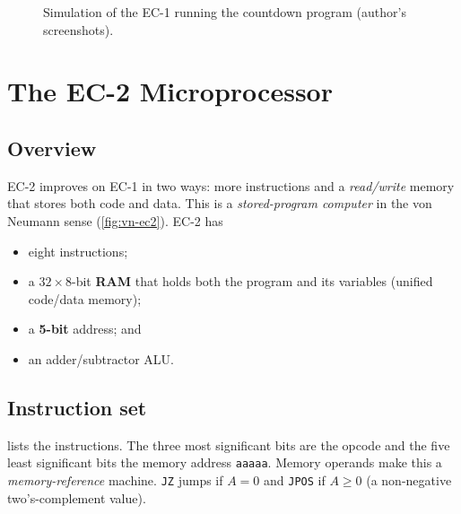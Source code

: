 \begin{figure}[htbp]
\centering
\ContinuedFloat
{}
\caption[]{Simulation of the EC-1 running the countdown program (author's screenshots).}
\end{figure}


\section{The EC-2 Microprocessor}\label{sec:ec2}
\subsection{Overview}
EC-2 improves on EC-1 in two ways: more instructions and a \emph{read/write} memory that stores both code and data. This is a \emph{stored-program computer} in the von Neumann sense (\cref{fig:vn-ec2}). EC-2 has
\begin{itemize}
  \item eight instructions;
  \item a $32\times8$-bit \textbf{RAM} that holds both the program and its variables (unified code/data memory);
  \item a \textbf{5-bit} address; and
  \item an adder/subtractor ALU.
\end{itemize}


\subsection{Instruction set}
 lists the instructions. The three most significant bits are the opcode and the five least significant bits the memory address \texttt{aaaaa}. Memory operands make this a \emph{memory-reference} machine. \texttt{JZ} jumps if $A=0$ and \texttt{JPOS} if $A\ge0$ (a non-negative two's-complement value).

